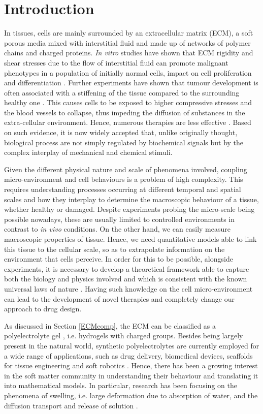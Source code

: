 \section{Introduction}

In tissues, cells are mainly surrounded by an extracellular matrix (ECM), a soft porous media mixed with interstitial fluid and made up of networks of polymer chains and charged proteins. \textit{In vitro} studies have shown that ECM rigidity and shear stresses due to the flow of interstitial fluid can promote malignant phenotypes in a population of initially normal cells, impact on cell proliferation and differentiation \cite{ex3}. Further experiments have shown that tumour development is often associated with a stiffening of the tissue compared to the surrounding healthy one \cite{ex4}. This causes cells to be exposed to higher compressive stresses and the blood vessels to collapse, thus impeding the diffusion of substances in the extra-cellular environment. Hence, numerous therapies are less effective \cite{ecm2}. Based on such evidence, it is now widely accepted that, unlike originally thought, biological process are not simply regulated by biochemical signals but by the complex interplay of mechanical and chemical stimuli.
 
Given the different physical nature and scale of phenomena involved, coupling micro-environment and cell behaviours is a problem of high complexity. This requires understanding processes occurring at different temporal and spatial scales and how they interplay to determine the macroscopic behaviour of a tissue, whether healthy or damaged. Despite experiments probing the micro-scale being possible nowadays, these are usually limited to controlled environments in contrast to \textit{in vivo} conditions. On the other hand, we can easily measure macroscopic properties of tissue. Hence, we need quantitative models able to link this tissue to the cellular scale, so as to extrapolate information on the environment that cells perceive. In order for this to be possible, alongside experiments, it is necessary to develop a theoretical framework able to capture both the biology and physics involved and which is consistent with the known universal laws of nature \cite{NET}. Having such knowledge on the cell micro-environment can lead to the development of novel therapies and completely change our approach to drug design.  

As discussed in Section \ref{ECMcomp}, the ECM can be classified as a polyelectrolyte gel \cite{ecm1,ecm2}, i.e. hydrogels with charged groups. Besides being largely present in the natural world, synthetic polyelectrolytes are currently employed for a wide range of applications, such as drug delivery, biomedical devices, scaffolds for tissue engineering and soft robotics \cite{hydroex3,hydroex2,hydroex1,hydroex4}. Hence, there has been a growing interest in the soft matter community in understanding their behaviour and translating it into mathematical models. In particular, research has been focusing on the phenomena of swelling, i.e. large deformation due to absorption of water, and the diffusion transport and release of solution \cite{DROZDOV+,DROZDOVph,Reviewpolyel,swell2}.

